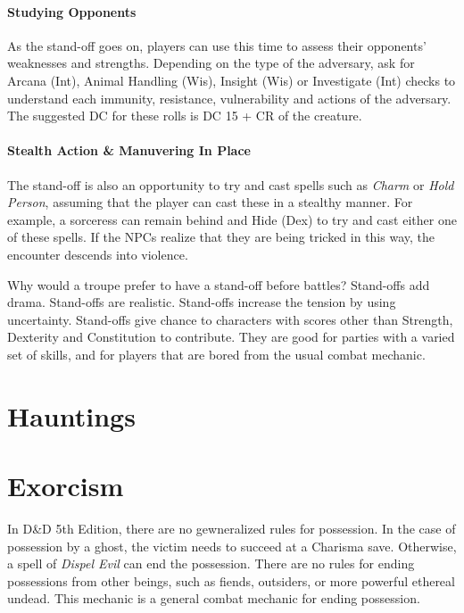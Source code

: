 \documentclass[twocolumn]{dndbook}
\begin{document}
\paragraph*{Studying Opponents}
As the stand-off goes on, players can use this time to assess their opponents' weaknesses and strengths.
Depending on the type of the adversary, ask for Arcana (Int), Animal Handling (Wis), Insight (Wis) or Investigate (Int) checks to understand each immunity, resistance, vulnerability and actions of the adversary.
The suggested DC for these rolls is DC 15 + CR of the creature.\par

\paragraph*{Stealth Action \& Manuvering In Place}
The stand-off is also an opportunity to try and cast spells such as \emph{Charm} or \emph{Hold Person}, assuming that the player can cast these in a stealthy manner.
For example, a sorceress can remain behind and Hide (Dex) to try and cast either one of these spells.
If the NPCs realize that they are being tricked in this way, the encounter descends into violence.\par

\begin{emphasisParagraph}
	Why would a troupe prefer to have a stand-off before battles?
	Stand-offs add drama. Stand-offs are realistic.
	Stand-offs increase the tension by using uncertainty.
	Stand-offs give chance to characters with scores other than Strength, Dexterity and Constitution to contribute.
	They are good for parties with a varied set of skills, and for players that are bored from the usual combat mechanic.\par
\end{emphasisParagraph}

\section{Hauntings}
\section{Exorcism}

In D\&D 5th Edition, there are no gewneralized rules for possession.
In the case of possession by a ghost, the victim needs to succeed at a Charisma save.
Otherwise, a spell of \emph{Dispel Evil} can end the possession.
There are no rules for ending possessions from other beings, such as fiends, outsiders, or more powerful ethereal undead.
This mechanic is a general combat mechanic for ending possession.\par
\end{document}
